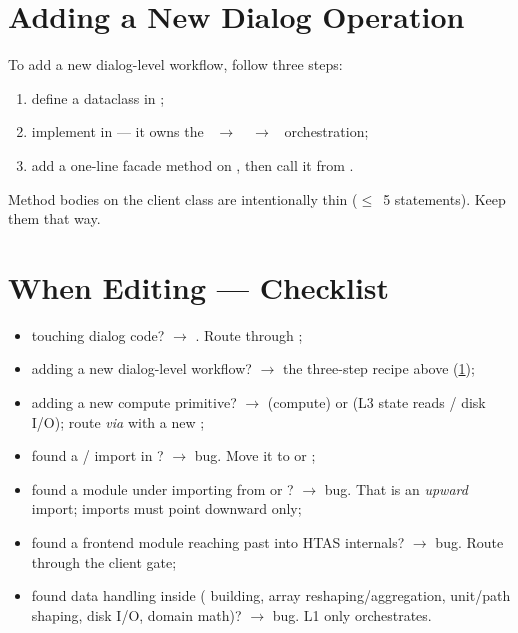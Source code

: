 \section{Adding a New Dialog Operation}
\label{sec-dev-add-op}

To add a new dialog-level workflow, follow three steps:

\begin{enumerate}
    \item define a  dataclass in ;
    \item implement  in  --- it owns the ~$\rightarrow$~~$\rightarrow$~ orchestration;
    \item add a one-line facade method on , then call it from .
\end{enumerate}

Method bodies on the client class are intentionally thin ($\leq$~5 statements). Keep them that way.

\section{When Editing --- Checklist}
\label{sec-dev-checklist}

\begin{itemize}
    \item touching dialog code? $\rightarrow$ . Route through ;
    \item adding a new dialog-level workflow? $\rightarrow$ the three-step recipe above (\cref{sec-dev-add-op});
    \item adding a new compute primitive? $\rightarrow$  (compute) or  (L3 state reads / disk I/O); route \textit{via}  with a new ;
    \item found a  /  import in ? $\rightarrow$ bug. Move it to  or ;
    \item found a module under  importing from  or ? $\rightarrow$ bug. That is an \emph{upward} import; imports must point downward only;
    \item found a frontend module reaching past  into HTAS internals? $\rightarrow$ bug. Route through the client gate;
    \item found data handling inside  ( building, array reshaping/aggregation, unit/path shaping, disk I/O, domain math)? $\rightarrow$ bug. L1 only orchestrates.
\end{itemize}

